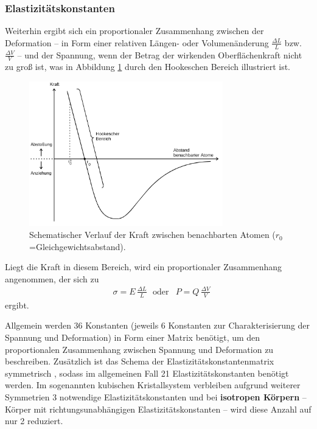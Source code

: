 \subsubsection{Elastizitätskonstanten}
Weiterhin ergibt sich ein proportionaler Zusammenhang zwischen der Deformation -- in Form
einer relativen Längen- oder Volumenänderung $\frac{\Delta L}{L}$ bzw.
$\frac{\Delta V}{V}$ -- und der Spannung, wenn der Betrag der wirkenden Oberflächenkraft nicht
zu groß ist, was in Abbildung \ref{fig:Hooki} durch den Hookeschen Bereich illustriert ist.
\begin{figure}
	\centering
	\includegraphics[width=0.75\textwidth]{Bilder/HookscherBereich.png}
	\caption{Schematischer Verlauf der Kraft zwischen benachbarten Atomen ($r_{\mathrm{0}}$=Gleichgewichtsabstand).  \cite{Anleitung}}
	\label{fig:Hooki}
\end{figure}
Liegt die Kraft in diesem Bereich, wird ein proportionaler Zusammenhang angenommen, der sich zu
\begin{align}
	\label{eqn:elastimodi}
	  & \sigma = E \, \frac{\Delta L}{L} \,\,\,\, \mathrm{oder} & P = Q \, \frac{\Delta V}{V}
\end{align}
ergibt.

Allgemein werden 36 Konstanten (jeweils 6 Konstanten zur Charakterisierung der Spannung und
Deformation) in Form einer Matrix benötigt, um den proportionalen Zusammenhang zwischen
Spannung und Deformation zu beschreiben.
Zusätzlich ist das Schema der Elastizitätskonstantenmatrix symmetrisch \cite{Ergebnis der
exakten Naturwissenschaften vierter band , googlen 21 elastsoooss}, sodass im allgemeinen Fall
21 Elastizitätskonstanten benötigt werden.
Im sogenannten kubischen Kristallsystem verbleiben aufgrund weiterer Symmetrien 3 notwendige
Elastizitätskonstanten und bei \textbf{isotropen Körpern} -- Körper mit richtungsunabhängigen
Elastizitätskonstanten -- wird diese Anzahl auf nur 2 reduziert.

